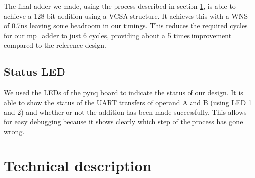 \documentclass[a4paper,kul]{kulakarticle} %
\begin{document}
The final adder we made, using the process described in section \ref{sec:tech_desc}, is able to achieve a 128 bit addition using a VCSA structure. It achieves this with a WNS of 0.7ns leaving some headroom in our timings. This reduces the required cycles for our mp\_adder to just 6 cycles, providing about a 5 times improvement compared to the reference design. 

\subsection{Status LED}

We used the LEDs of the pynq board to indicate the status of our design. It is able to show the status of the UART transfers of operand A and B (using LED 1 and 2) and whether or not the addition has been made successfully. This allows for easy debugging because it shows clearly which step of the process has gone wrong. 


\newpage
\section{Technical description}
\label{sec:tech_desc}

\end{document}
